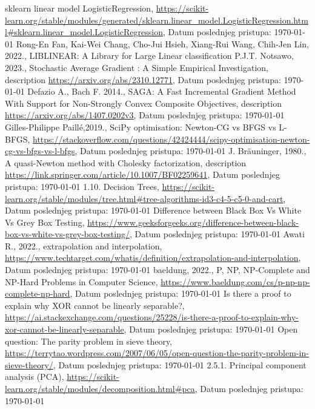 \documentclass[fontsize=12bp, paper=a4]{scrarticle}
\begin{document}
\begin{thebibliography}{1}
    sklearn linear model LogisticRegression, \url{https://scikit-learn.org/stable/modules/generated/sklearn.linear_model.LogisticRegression.html#sklearn.linear_model.LogisticRegression}, Datum poslednjeg pristupa: \today
    Rong-En Fan, Kai-Wei Chang, Cho-Jui Hsieh, Xiang-Rui Wang, Chih-Jen Lin, 2022., LIBLINEAR: A Library for Large Linear classification
    P.J.T. Notsawo, 2023., Stochastic Average Gradient : A Simple Empirical Investigation, description \url{https://arxiv.org/abs/2310.12771}, Datum poslednjeg pristupa: \today
    Defazio A., Bach F. 2014., SAGA: A Fast Incremental Gradient Method With Support for Non-Strongly Convex Composite Objectives, description \url{https://arxiv.org/abs/1407.0202v3}, Datum poslednjeg pristupa: \today
    Gilles-Philippe Paillé,2019., SciPy optimisation: Newton-CG vs BFGS vs L-BFGS, \url{https://stackoverflow.com/questions/42424444/scipy-optimisation-newton-cg-vs-bfgs-vs-l-bfgs}, Datum poslednjeg pristupa: \today
    J. Bräuninger, 1980., A quasi-Newton method with Cholesky factorization, description \url{https://link.springer.com/article/10.1007/BF02259641}, Datum poslednjeg pristupa: \today
    1.10. Decision Trees, \url{https://scikit-learn.org/stable/modules/tree.html#tree-algorithms-id3-c4-5-c5-0-and-cart}, Datum poslednjeg pristupa: \today
    Difference between Black Box Vs White Vs Grey Box Testing, \url{https://www.geeksforgeeks.org/difference-between-black-box-vs-white-vs-grey-box-testing/}, Datum poslednjeg pristupa: \today
     Awati R., 2022., extrapolation and interpolation, \url{https://www.techtarget.com/whatis/definition/extrapolation-and-interpolation}, Datum poslednjeg pristupa: \today
     baeldung, 2022., P, NP, NP-Complete and NP-Hard Problems in Computer Science, \url{https://www.baeldung.com/cs/p-np-np-complete-np-hard}, Datum poslednjeg pristupa: \today
     Is there a proof to explain why XOR cannot be linearly separable?, \url{https://ai.stackexchange.com/questions/25228/is-there-a-proof-to-explain-why-xor-cannot-be-linearly-separable}, Datum poslednjeg pristupa: \today
     Open question: The parity problem in sieve theory, \url{https://terrytao.wordpress.com/2007/06/05/open-question-the-parity-problem-in-sieve-theory/}, Datum poslednjeg pristupa: \today
     2.5.1. Principal component analysis (PCA), \url{https://scikit-learn.org/stable/modules/decomposition.html#pca}, Datum poslednjeg pristupa: \today

\end{thebibliography}
\end{document}
